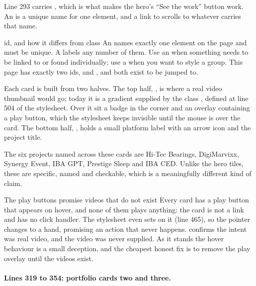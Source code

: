 Line 293 carries , which is what makes the hero's ``See the
work'' button work. An  is a unique name for one element, and a link to
 scrolls to whatever carries that name.

\begin{jargon}{id, and how it differs from class}
An  names exactly one element on the page and must be unique. A
 labels any number of them. Use an  when something needs to
be linked to or found individually; use a  when you want to style a
group. This page has exactly two ids,  and , and both
exist to be jumped to.
\end{jargon}

Each card is built from two halves. The top half, , is where a
real video thumbnail would go; today it is a gradient supplied by the class
, defined at line 504 of the stylesheet. Over it sit a badge in the
corner and an overlay containing a play button, which the stylesheet keeps
invisible until the mouse is over the card. The bottom half, ,
holds a small platform label with an arrow icon and the project title.

The six projects named across these cards are Hi-Tec Bearings, DigiMarvixx,
Synergy Event, IBA GPT, Prestige Sleep and IBA CED. Unlike the hero tiles, these
are specific, named and checkable, which is a meaningfully different kind of
claim.

\begin{honest}{The play buttons promise videos that do not exist}
Every card has a play button that appears on hover, and none of them plays
anything: the card is not a link and has no click handler. The stylesheet even
sets  on it (line 465), so the pointer changes to a hand,
promising an action that never happens.  confirms the intent was
real video, and the video was never supplied. As it stands the hover behaviour is
a small deception, and the cheapest honest fix is to remove the play overlay
until the videos exist.
\end{honest}

\paragraph{Lines 319 to 354: portfolio cards two and three.}

